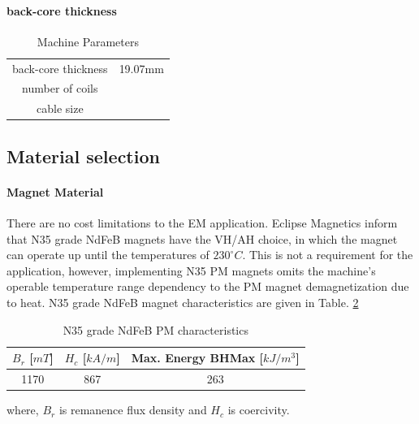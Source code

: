 \documentclass [a4 paper, 11pt, titlepage] {article}
\begin{document}
	\paragraph{back-core thickness}
		\begin{table}[h]
		\begin{center}
			\begin{tabular}{c|c}
				 &  \\
				\hline
				back-core thickness & 19.07mm \\
				number of coils & \\
				cable size & 
			\end{tabular}
		\end{center}
		\caption{Machine Parameters}
		\label{tab:machineParameters}
	\end{table}
	
	
	
	
	
	
	
	
	
	\subsection{Material selection}
	
	\paragraph{Magnet Material} There are no cost limitations to the EM application. Eclipse Magnetics inform that N35 grade NdFeB magnets have the VH/AH choice, in which the magnet can operate up until the temperatures of $230^{\circ}C$. This is not a requirement for the application, however, implementing N35 PM magnets omits the machine's operable temperature range dependency to the PM magnet demagnetization due to heat.
	N35 grade NdFeB magnet characteristics are given in Table. \ref{tab:N35}
	
	\begin{table}[h]
		\begin{center}
			\begin{tabular}{c|c|c}
				$B_r$ [$mT$] & $H_c$ [$kA/m$] & Max. Energy BHMax [$kJ/m^3$] \\
				\hline
				1170 & 867 & 263
			\end{tabular}
		\end{center}
		\caption{N35 grade NdFeB PM characteristics}
		\label{tab:N35}
	\end{table}
	where, $B_r$ is remanence flux density and $H_c$ is coercivity.
	
\end{document}
